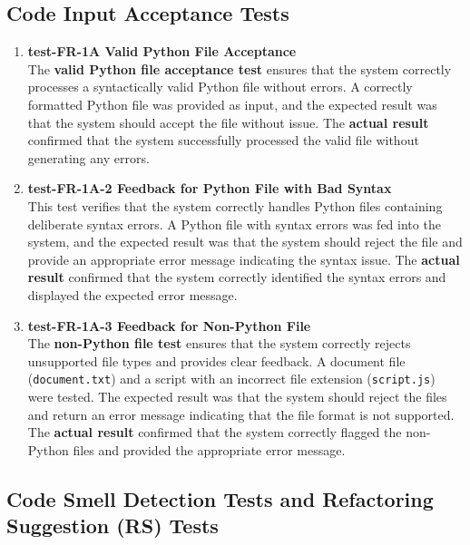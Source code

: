 \documentclass[12pt, titlepage]{article}
\begin{document}
\subsection{Code Input Acceptance Tests}
\begin{enumerate}

  \item \textbf{test-FR-1A Valid Python File Acceptance} \\[2mm]
    The \textbf{valid Python file acceptance test} ensures that the
    system correctly processes a syntactically valid Python file
    without errors. A correctly formatted Python file was provided as
    input, and the expected result was that the system should accept
    the file without issue. The \textbf{actual result} confirmed that
    the system successfully processed the valid file without
    generating any errors.

  \item \textbf{test-FR-1A-2 Feedback for Python File with Bad Syntax} \\[2mm]
    This test verifies that the system correctly handles Python files
    containing deliberate syntax errors. A Python file with syntax
    errors was fed into the system, and the expected result was that
    the system should reject the file and provide an appropriate
    error message indicating the syntax issue. The \textbf{actual
    result} confirmed that the system correctly identified the syntax
    errors and displayed the expected error message.

  \item \textbf{test-FR-1A-3 Feedback for Non-Python File} \\[2mm]
    The \textbf{non-Python file test} ensures that the system
    correctly rejects unsupported file types and provides clear
    feedback. A document file (\texttt{document.txt}) and a script
    with an incorrect file extension (\texttt{script.js}) were
    tested. The expected result was that the system should reject the
    files and return an error message indicating that the file format
    is not supported. The \textbf{actual result} confirmed that the
    system correctly flagged the non-Python files and provided the
    appropriate error message.

\end{enumerate}

\subsection{Code Smell Detection Tests and Refactoring Suggestion (RS) Tests}
\end{document}
